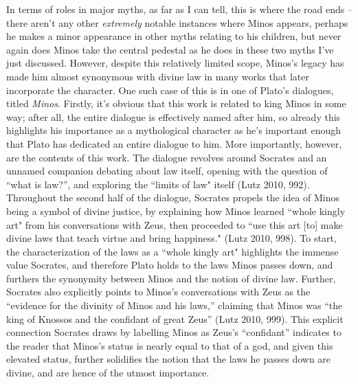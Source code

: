\documentclass[12pt]{article}
\begin{document}
	In terms of roles in major myths, as far as I can tell, this is where the road ends -- there aren't any other 
	\textit{extremely} notable instances where Minos appears, perhaps he makes a minor appearance in other 
	myths relating to his children, but never again does Minos take the central pedestal as he does 
	in these two myths I've just discussed. However, despite this 
	relatively limited scope, Minos's legacy has made him almost synonymous with divine law in many works that 
	later incorporate the character. One such case of this is in one of Plato's dialogues, titled \textit{Minos}. 
	Firstly, it's obvious that this work is related to king Minos in some way; after all, the entire dialogue is 
	effectively named after him, so already this highlights his importance as a mythological character as he's 
	important enough that Plato has dedicated an entire dialogue to him. More importantly, however, are the contents 
	of this work. The dialogue revolves around Socrates and an unnamed companion debating about law itself, opening
	with the question of ``what is law?'', and exploring the ``limits of law" itself (Lutz 2010, 992). Throughout 
	the second half of the dialogue, Socrates propels the idea of Minos being a symbol of divine justice, by 
	explaining how Minos learned ``whole kingly art" from his conversations with Zeus, then proceeded to 
	``use this art [to] make divine laws that teach virtue and bring happiness." (Lutz 2010, 998). To start, 
	the characterization of the laws as a ``whole kingly art" highlights the immense value Socrates, and therefore 
	Plato holds to the laws Minos passes down, and furthers the synonymity between Minos and the notion of divine law.
	Further, Socrates also explicitly points to Minos's conversations with Zeus as the ``evidence for the divinity 
	of Minos and his laws,'' claiming that Minos was ``the king of Knossos and the confidant of great Zeus'' 
	(Lutz 2010, 999). This explicit connection Socrates draws by labelling Minos as Zeus's ``confidant'' indicates
	to the reader that Minos's status is nearly equal to that of a god, and given this elevated status, further 
	solidifies the notion that the laws he passes down are divine, and are hence of the utmost importance.  
\end{document}
